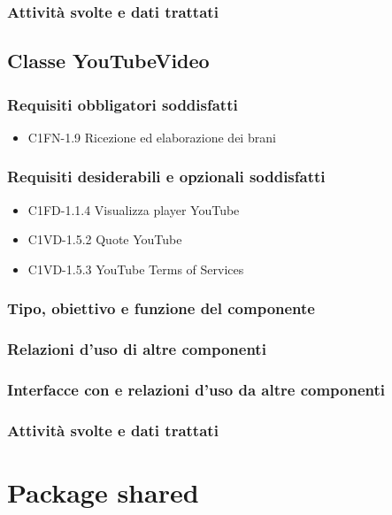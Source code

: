 \subsubsection*{Attivit\`a svolte e dati trattati}

\subsection{Classe YouTubeVideo}
\subsubsection*{Requisiti obbligatori soddisfatti}
\begin{itemize}
    \item C1FN-1.9 Ricezione ed elaborazione dei brani
\end{itemize}
\subsubsection*{Requisiti desiderabili e opzionali soddisfatti}
\begin{itemize}
    \item C1FD-1.1.4 Visualizza player YouTube
    \item C1VD-1.5.2 Quote YouTube
    \item C1VD-1.5.3 YouTube Terms of Services
\end{itemize}
\subsubsection*{Tipo, obiettivo e funzione del componente}
\subsubsection*{Relazioni d'uso di altre componenti}
\subsubsection*{Interfacce con e relazioni d'uso da altre componenti}
\subsubsection*{Attivit\`a svolte e dati trattati}




\newpage
\section{Package shared}

